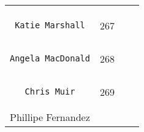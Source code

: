 \documentclass[]{article}
\begin{document}
\begin{longtable}[c]{@{}llll@{}}
\begin{minipage}[t]{0.15\columnwidth}
\end{minipage}
\\\noalign{\medskip}
\begin{minipage}[t]{0.39\columnwidth}\raggedright
\begin{verbatim}
 Katie Marshall
\end{verbatim}
\end{minipage} & \begin{minipage}[t]{0.10\columnwidth}\raggedright
267
\end{minipage} & \begin{minipage}[t]{0.13\columnwidth}\raggedright
\end{minipage} & \begin{minipage}[t]{0.15\columnwidth}\raggedright
\end{minipage}
\\\noalign{\medskip}
\begin{minipage}[t]{0.39\columnwidth}\raggedright
\begin{verbatim}
Angela MacDonald
\end{verbatim}
\end{minipage} & \begin{minipage}[t]{0.10\columnwidth}\raggedright
268
\end{minipage} & \begin{minipage}[t]{0.13\columnwidth}\raggedright
\end{minipage} & \begin{minipage}[t]{0.15\columnwidth}\raggedright
\end{minipage}
\\\noalign{\medskip}
\begin{minipage}[t]{0.39\columnwidth}\raggedright
\begin{verbatim}
   Chris Muir
\end{verbatim}
\end{minipage} & \begin{minipage}[t]{0.10\columnwidth}\raggedright
269
\end{minipage} & \begin{minipage}[t]{0.13\columnwidth}\raggedright
\end{minipage} & \begin{minipage}[t]{0.15\columnwidth}\raggedright
\end{minipage}
\\\noalign{\medskip}
\begin{minipage}[t]{0.39\columnwidth}\raggedright
Phillipe Fernandez
\end{minipage} & \begin{minipage}[t]{0.10\columnwidth}\raggedright

\end{minipage}
\end{longtable}
\end{document}
